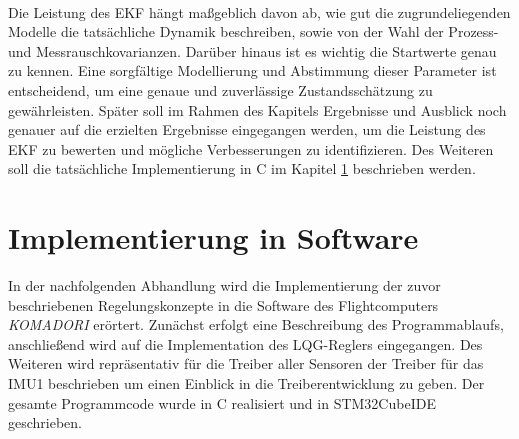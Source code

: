 \\
Die Leistung des EKF hängt maßgeblich davon ab, wie gut die zugrundeliegenden Modelle die tatsächliche Dynamik beschreiben, sowie von der Wahl der Prozess- und Messrauschkovarianzen. Darüber hinaus ist es wichtig die Startwerte genau zu kennen. Eine sorgfältige Modellierung und Abstimmung dieser Parameter ist entscheidend, um eine genaue und zuverlässige Zustandsschätzung zu gewährleisten. Später soll im Rahmen des Kapitels Ergebnisse und Ausblick noch genauer auf die erzielten Ergebnisse eingegangen werden, um die Leistung des EKF zu bewerten und mögliche Verbesserungen zu identifizieren. Des Weiteren soll die tatsächliche Implementierung in C im Kapitel \ref{ch:implementation_in_software} beschrieben werden.
\chapter{Implementierung in Software}
\label{ch:implementation_in_software}
In der nachfolgenden Abhandlung wird die Implementierung der zuvor beschriebenen Regelungskonzepte in die Software des Flightcomputers \textit{KOMADORI} erörtert. Zunächst erfolgt eine Beschreibung des Programmablaufs, anschließend wird auf die Implementation des LQG-Reglers eingegangen.
Des Weiteren wird repräsentativ für die Treiber aller Sensoren der Treiber für das IMU1 beschrieben um einen Einblick in die Treiberentwicklung zu geben. Der gesamte Programmcode wurde in C realisiert und in STM32CubeIDE geschrieben.
